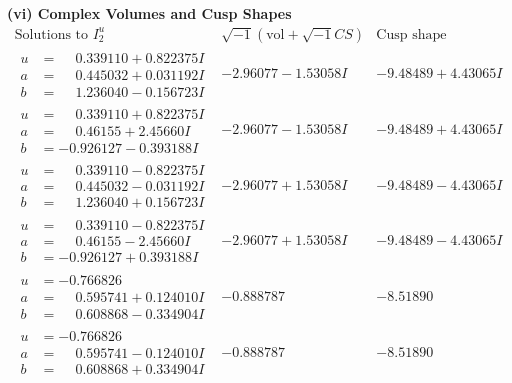 \documentclass[1p]{elsarticle_modified}
\theoremstyle{definition}
\newcommand{\I}{\sqrt{-1}}
\begin{document}
\newpage\flushleft \textbf{(vi) Complex Volumes and Cusp Shapes}
$$\begin{array}{c|c|c}  
\text{Solutions to }I^u_{2}& \I (\text{vol} + \sqrt{-1}CS) & \text{Cusp shape}\\
 \hline 
\begin{aligned}
u &= \phantom{-}0.339110 + 0.822375 I \\
a &= \phantom{-}0.445032 + 0.031192 I \\
b &= \phantom{-}1.236040 - 0.156723 I\end{aligned}
 & -2.96077 - 1.53058 I & -9.48489 + 4.43065 I \\ \hline\begin{aligned}
u &= \phantom{-}0.339110 + 0.822375 I \\
a &= \phantom{-}0.46155 + 2.45660 I \\
b &= -0.926127 - 0.393188 I\end{aligned}
 & -2.96077 - 1.53058 I & -9.48489 + 4.43065 I \\ \hline\begin{aligned}
u &= \phantom{-}0.339110 - 0.822375 I \\
a &= \phantom{-}0.445032 - 0.031192 I \\
b &= \phantom{-}1.236040 + 0.156723 I\end{aligned}
 & -2.96077 + 1.53058 I & -9.48489 - 4.43065 I \\ \hline\begin{aligned}
u &= \phantom{-}0.339110 - 0.822375 I \\
a &= \phantom{-}0.46155 - 2.45660 I \\
b &= -0.926127 + 0.393188 I\end{aligned}
 & -2.96077 + 1.53058 I & -9.48489 - 4.43065 I \\ \hline\begin{aligned}
u &= -0.766826\phantom{ +0.000000I} \\
a &= \phantom{-}0.595741 + 0.124010 I \\
b &= \phantom{-}0.608868 - 0.334904 I\end{aligned}
 & -0.888787\phantom{ +0.000000I} & -8.51890\phantom{ +0.000000I} \\ \hline\begin{aligned}
u &= -0.766826\phantom{ +0.000000I} \\
a &= \phantom{-}0.595741 - 0.124010 I \\
b &= \phantom{-}0.608868 + 0.334904 I\end{aligned}
 & -0.888787\phantom{ +0.000000I} & -8.51890\phantom{ +0.000000I} \\ \hline\begin{aligned}

\end{aligned}
\end{array}$$
\end{document}
